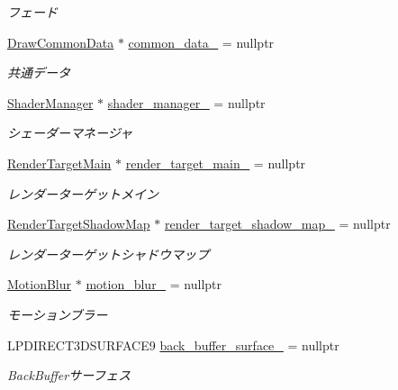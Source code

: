 \begin{DoxyCompactItemize}
\begin{DoxyCompactList}\small\item\em フェード \end{DoxyCompactList}\item 
\mbox{\hyperlink{class_draw_common_data}{Draw\+Common\+Data}} $\ast$ \mbox{\hyperlink{class_draw_manager_af3a485559a0775ae3c91a9e11f0b38b9}{common\+\_\+data\+\_\+}} = nullptr
\begin{DoxyCompactList}\small\item\em 共通データ \end{DoxyCompactList}\item 
\mbox{\hyperlink{class_shader_manager}{Shader\+Manager}} $\ast$ \mbox{\hyperlink{class_draw_manager_aac4cfc76f2953c30ed5eac54b544d0ad}{shader\+\_\+manager\+\_\+}} = nullptr
\begin{DoxyCompactList}\small\item\em シェーダーマネージャ \end{DoxyCompactList}\item 
\mbox{\hyperlink{class_render_target_main}{Render\+Target\+Main}} $\ast$ \mbox{\hyperlink{class_draw_manager_adb8b9963366e759ddff11b731e8227fd}{render\+\_\+target\+\_\+main\+\_\+}} = nullptr
\begin{DoxyCompactList}\small\item\em レンダーターゲットメイン \end{DoxyCompactList}\item 
\mbox{\hyperlink{class_render_target_shadow_map}{Render\+Target\+Shadow\+Map}} $\ast$ \mbox{\hyperlink{class_draw_manager_a04d6579daa5eab5c8be09cdd71230766}{render\+\_\+target\+\_\+shadow\+\_\+map\+\_\+}} = nullptr
\begin{DoxyCompactList}\small\item\em レンダーターゲットシャドウマップ \end{DoxyCompactList}\item 
\mbox{\hyperlink{class_motion_blur}{Motion\+Blur}} $\ast$ \mbox{\hyperlink{class_draw_manager_a7fa35cb3feedc74021e598cab58bf948}{motion\+\_\+blur\+\_\+}} = nullptr
\begin{DoxyCompactList}\small\item\em モーションブラー \end{DoxyCompactList}\item 
L\+P\+D\+I\+R\+E\+C\+T3\+D\+S\+U\+R\+F\+A\+C\+E9 \mbox{\hyperlink{class_draw_manager_ad72f838eeb9a9acd7dbed202a78514b5}{back\+\_\+buffer\+\_\+surface\+\_\+}} = nullptr
\begin{DoxyCompactList}\small\item\em Back\+Bufferサーフェス \end{DoxyCompactList}\item 

\end{DoxyCompactItemize}
